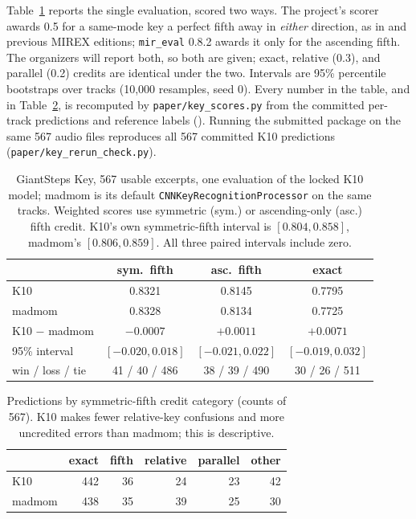 \documentclass{article}
\begin{document}
Table~\ref{tab:gskey} reports the single evaluation, scored two ways. The project's
scorer awards 0.5 for a same-mode key a perfect fifth away in \emph{either} direction,
as in \cite{korzeniowski2018genre} and previous MIREX editions; \texttt{mir\_eval}
0.8.2 \cite{raffel2014mireval} awards it only for the ascending fifth. The organizers
will report both, so both are given; exact, relative (0.3), and parallel (0.2) credits
are identical under the two. Intervals are 95\% percentile bootstraps over tracks
(10{,}000 resamples, seed 0). Every number in the table, and in
Table~\ref{tab:errors}, is recomputed by \texttt{paper/key\_scores.py} from the
committed per-track predictions and reference labels
(). Running the submitted package on
the same 567 audio files reproduces all 567 committed K10 predictions
(\texttt{paper/key\_rerun\_check.py}).

\begin{table}[t]
\centering\small
\setlength{\tabcolsep}{4pt}
\footnotesize
\begin{tabular}{@{}lccc@{}}
\toprule
 & sym.\ fifth & asc.\ fifth & exact \\
\midrule
K10 & 0.8321 & 0.8145 & 0.7795 \\
madmom & 0.8328 & 0.8134 & 0.7725 \\
\midrule
K10 $-$ madmom & $-0.0007$ & $+0.0011$ & $+0.0071$ \\
95\% interval & $[-0.020, 0.018]$ & $[-0.021, 0.022]$ & $[-0.019, 0.032]$ \\
win / loss / tie & 41 / 40 / 486 & 38 / 39 / 490 & 30 / 26 / 511 \\
\bottomrule
\end{tabular}
\caption{GiantSteps Key, 567 usable excerpts, one evaluation of the locked K10 model;
madmom is its default \texttt{CNNKeyRecognitionProcessor} on the same tracks. Weighted
scores use symmetric (sym.) or ascending-only (asc.) fifth credit. K10's own
symmetric-fifth interval is $[0.804, 0.858]$, madmom's $[0.806, 0.859]$. All three
paired intervals include zero.}
\label{tab:gskey}
\end{table}

\begin{table}[t]
\centering\small
\setlength{\tabcolsep}{5pt}
\begin{tabular}{lrrrrr}
\toprule
 & exact & fifth & relative & parallel & other \\
\midrule
K10 & 442 & 36 & 24 & 23 & 42 \\
madmom & 438 & 35 & 39 & 25 & 30 \\
\bottomrule
\end{tabular}
\caption{Predictions by symmetric-fifth credit category (counts of 567). K10 makes
fewer relative-key confusions and more uncredited errors than madmom; this is
descriptive.}
\label{tab:errors}
\end{table}
\end{document}
